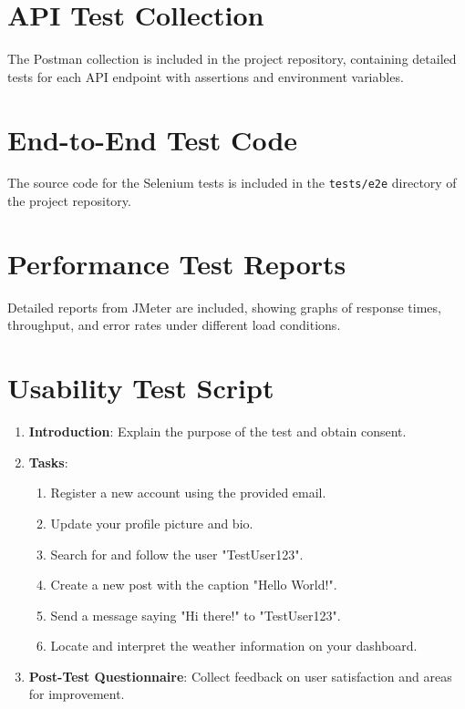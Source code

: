 \documentclass[12pt,a4paper]{report}
\begin{document}
\section{API Test Collection}
The Postman collection is included in the project repository, containing detailed tests for each API endpoint with assertions and environment variables.

\section{End-to-End Test Code}
The source code for the Selenium tests is included in the \texttt{tests/e2e} directory of the project repository.

\section{Performance Test Reports}
Detailed reports from JMeter are included, showing graphs of response times, throughput, and error rates under different load conditions.

\section{Usability Test Script}
\begin{enumerate}
    \item \textbf{Introduction}: Explain the purpose of the test and obtain consent.
    \item \textbf{Tasks}:
    \begin{enumerate}
        \item Register a new account using the provided email.
        \item Update your profile picture and bio.
        \item Search for and follow the user "TestUser123".
        \item Create a new post with the caption "Hello World!".
        \item Send a message saying "Hi there!" to "TestUser123".
        \item Locate and interpret the weather information on your dashboard.
    \end{enumerate}
    \item \textbf{Post-Test Questionnaire}: Collect feedback on user satisfaction and areas for improvement.
\end{enumerate}
\end{document}
